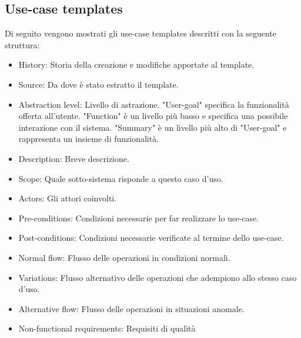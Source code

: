\documentclass{article}
\begin{document}
    \subsection{Use-case templates}
    Di seguito vengono mostrati gli use-case templates descritti con la seguente struttura:
    \begin{itemize}
        \item History: Storia della creazione e modifiche apportate al template.
        \item Source: Da dove è stato estratto il template.
        \item Abstraction level: Livello di astrazione. "User-goal" specifica la funzionalità offerta all'utente.
        "Function" è un livello più basso e specifica una possibile interazione con il sistema.
        "Summary" è un livello più alto di "User-goal" e rappresenta un insieme di funzionalità.
        \item Description: Breve descrizione.
        \item Scope: Quale sotto-sistema risponde a questo caso d'uso.
        \item Actors: Gli attori coinvolti.
        \item Pre-conditions: Condizioni necessarie per far realizzare lo use-case.
        \item Post-conditions: Condizioni necessarie verificate al termine dello use-case.
        \item Normal flow: Flusso delle operazioni in condizioni normali.
        \item Variations: Flusso alternativo delle operazioni che adempiono allo stesso caso d'uso.
        \item Alternative flow: Flusso delle operazioni in situazioni anomale.
        \item Non-functional requirements: Requisiti di qualità
    \end{itemize}
    \def\graycolor{gray!15}
    \def\creationDate{Creato il 19/02/24.\space}
\end{document}
